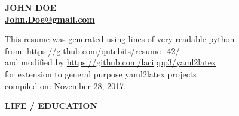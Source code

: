 \documentclass[11pt,english]{article}
\begin{document}

\begin{center}
\huge\bf\color{maincolor} JOHN DOE  \\
\small\color{black} \href{mailto: John.Doe@gmail.com }{ John.Doe@gmail.com } 
\end{center}

\begin{flushright}
\vspace{3.5mm}
\tiny This resume was generated using  lines of very readable python\\
\tiny from: \url{https://github.com/qutebits/resume\_42/}\\
\tiny and modified by \url{https://github.com/lacippp3/yaml2latex} \\
\tiny for extension to general purpose yaml2latex projects \\
\tiny compiled on: November 28, 2017.
\end{flushright}

\vspace{-18mm}

%
%
%
%
%
%
%
%

\medskip

\selectfont

\hspace{-20mm}\colorbox{maincolor}{\begin{minipage}[t][8mm][c]{75mm}
\hspace{20mm}\bfseries \color{white}  LIFE / EDUCATION
\end{minipage}}
\vspace{6mm}
\end{document}
